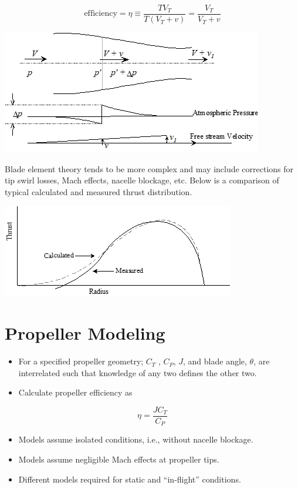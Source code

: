 \documentclass[
]{book}
\providecommand{\tightlist}{%
  \setlength{\itemsep}{0pt}\setlength{\parskip}{0pt}}
\begin{document}
\[
\text{efficiency} = \eta \equiv \frac{T V_T}{T \left( V_T + v \right)} = \frac{V_T}{V_T + v}
\]

\includegraphics[width=4.49931in,height=2.125in]{media/11/image18.png}

Blade element theory tends to be more complex and may include corrections for tip swirl losses, Mach effects, nacelle blockage, etc. Below is a comparison of typical calculated and measured thrust distribution.

\includegraphics[width=4.00972in,height=1.59375in]{media/11/image19.png}

\hypertarget{propeller-modeling}{%
\section{Propeller Modeling}\label{propeller-modeling}}

\begin{itemize}
\tightlist
\item
  For a specified propeller geometry; \(C_T\) , \(C_P\), \(J\), and blade angle, \(\theta\), are interrelated such that knowledge of any two defines the other two.
\item
  Calculate propeller efficiency as
\end{itemize}

\[
\eta = \frac{J C_T}{C_P}  
\]

\begin{itemize}
\tightlist
\item
  Models assume isolated conditions, i.e., without nacelle blockage.
\item
  Models assume negligible Mach effects at propeller tips.
\item
  Different models required for static and ``in-flight'' conditions.
\end{itemize}
\end{document}
